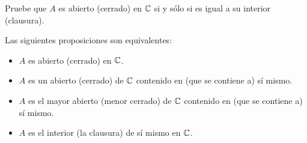 \begin{exercise}
Pruebe que $A$ es abierto (cerrado) en $\mathbb C$ si y sólo si es igual a su interior (clausura).
\end{exercise}

\begin{solution}
Las siguientes proposiciones son equivalentes:
\begin{itemize}
    \item $A$ es abierto (cerrado) en $\mathbb C$.
    \item $A$ es un abierto (cerrado) de $\mathbb C$ contenido en (que se contiene a) sí mismo.
    \item $A$ es el mayor abierto (menor cerrado) de $\mathbb C$ contenido en (que se contiene a) sí mismo.
    \item $A$ es el interior (la clausura) de sí mismo en $\mathbb C$.
\end{itemize}
\end{solution}
